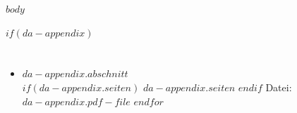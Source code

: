 \documentclass[
    headings=optiontotocandhead,%
    twoside,
    numbers=noenddot,%
    12pt, %
    titlepage, %
    parskip=full, %
    listof=leveldown, 
    numbers=noenddot, %
    a4paper,DIV=14,
    BCOR=15mm,
]{scrbook}
\makeatletter
\newcommand*{\authormark}{}
\newcommand*{\the@orig@section}{}
\let\the@orig@section\section
\renewcommand*{\section}{%
  \clearpage
  \the@orig@section
}
\makeatother
\begin{document}
\cleardoublepage{}
\setcounter{tocdepth}{3}
\tableofcontents{}

\raggedbottom
\cleardoublepage{}
\mainmatter
$body$

\renewcommand{\authormark}{}%
\cleardoublepage{}


$if(da-appendix)$


\translatelet{}
\section{\app}

\begin{itemize}

$for(da-appendix)$
\item \textbf{$da-appendix.abschnitt$}\\ $if(da-appendix.seiten)$ $da-appendix.seiten$  $endif$ Datei: \texttt{$da-appendix.pdf-file$}
$endfor$
\end{itemize}
\end{document}
